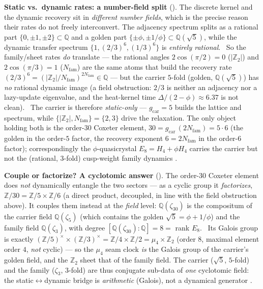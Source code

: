 \documentclass[11pt,a4paper]{article}
\newcommand{\gcar}{g_{\mathrm{car}}}
\newcommand{\Nfam}{N_{\mathrm{fam}}}
\newcommand{\Z}{\mathbb Z}
\begin{document}
\par\smallskip\noindent\textbf{Static vs.\ dynamic rates: a number-field split}
(). The discrete kernel and the dynamic recovery sit in \emph{different number
fields}, which is the precise reason their rates do not freely interconvert. The adjacency spectrum splits as a
rational part $\{0,\pm1,\pm2\}\subset\mathbb Q$ and a golden part $\{\pm\phi,\pm1/\phi\}\subset\mathbb Q(\sqrt5)$,
while the dynamic transfer spectrum $\{1,(2/3)^6,(1/3)^6\}$ is \emph{entirely rational}. \mE\ So the family/sheet
rates \emph{do} translate --- the rational angles $2\cos(\pi/2){=}0$ ($|\Z_2|$) and $2\cos(\pi/3){=}1$ ($\Nfam$)
are the same atoms that build the recovery rate $(2/3)^6=(|\Z_2|/\Nfam)^{2\Nfam}\in\mathbb Q$ --- but the carrier
$5$-fold (golden, $\mathbb Q(\sqrt5)$) has \emph{no} rational dynamic image (a field obstruction: $2/3$ is neither
an adjacency nor a lazy-update eigenvalue, and the heat-kernel time $\Delta/(2-\phi)\approx6.37$ is not clean).
\mE\ The carrier is therefore \emph{static-only} --- $\gcar{=}5$ builds the lattice and spectrum, while
$\{|\Z_2|,\Nfam\}{=}\{2,3\}$ drive the relaxation. The only object holding both is the order-$30$ Coxeter element,
$30=\gcar\,(2\Nfam)=5\cdot6$ (the golden in the order-$5$ factor, the recovery exponent $6{=}2\Nfam$ in the
order-$6$ factor); correspondingly the $\phi$-quasicrystal $E_8=H_4{+}\phi H_4$ carries the carrier but not the
(rational, $3$-fold) cusp-weight family dynamics \mC.

\par\smallskip\noindent\textbf{Couple or factorize? A cyclotomic answer}
(). The order-$30$ Coxeter element does \emph{not} dynamically entangle the two
sectors --- as a cyclic group it \emph{factorizes}, $\Z/30=\Z/5\times\Z/6$ (a direct product, decoupled, in line
with the field obstruction above). It couples them instead at the \emph{field} level: $\mathbb Q(\zeta_{30})$ is the
compositum of the carrier field $\mathbb Q(\zeta_5)$ (which contains the golden $\sqrt5=\phi+1/\phi$) and the family
field $\mathbb Q(\zeta_3)$, with degree $[\mathbb Q(\zeta_{30}){:}\mathbb Q]=8=$ rank $E_8$. \mE\ Its Galois group is
exactly $(\Z/5)^\times\times(\Z/3)^\times=\Z/4\times\Z/2=\mu_4\times\Z_2$ (order $8$, maximal element order $4$,
\emph{not} cyclic) --- so the $\mu_4$ seam clock \emph{is} the Galois group of the carrier's golden field, and the
$\Z_2$ sheet that of the family field. The carrier ($\sqrt5$, $5$-fold) and the family ($\zeta_3$, $3$-fold) are
thus conjugate sub-data of \emph{one} cyclotomic field: the static$\leftrightarrow$dynamic bridge is
\emph{arithmetic} (Galois), not a dynamical generator \mC.
\end{document}
